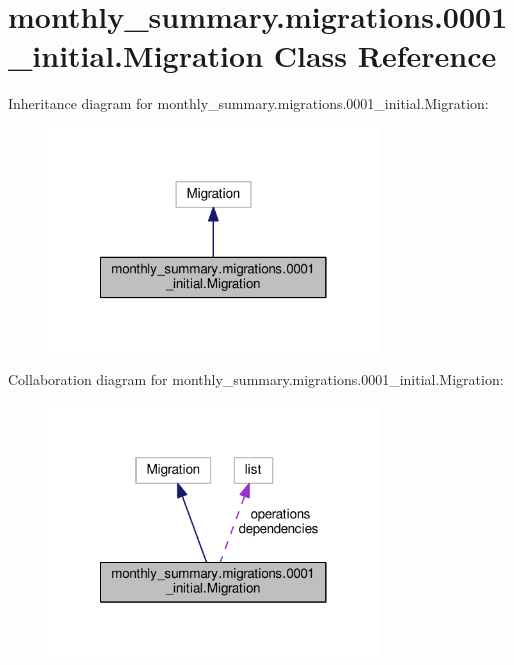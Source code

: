 \hypertarget{classmonthly__summary_1_1migrations_1_10001__initial_1_1Migration}{\section{monthly\-\_\-summary.\-migrations.0001\-\_\-initial.Migration Class Reference}
\label{classmonthly__summary_1_1migrations_1_10001__initial_1_1Migration}
}


Inheritance diagram for monthly\-\_\-summary.\-migrations.0001\-\_\-initial.Migration\-:
\nopagebreak
\begin{figure}[H]
\begin{center}
\leavevmode
\includegraphics[width=248pt]{classmonthly__summary_1_1migrations_1_10001__initial_1_1Migration__inherit__graph}
\end{center}
\end{figure}


Collaboration diagram for monthly\-\_\-summary.\-migrations.0001\-\_\-initial.Migration\-:
\nopagebreak
\begin{figure}[H]
\begin{center}
\leavevmode
\includegraphics[width=248pt]{classmonthly__summary_1_1migrations_1_10001__initial_1_1Migration__coll__graph}
\end{center}
\end{figure}
